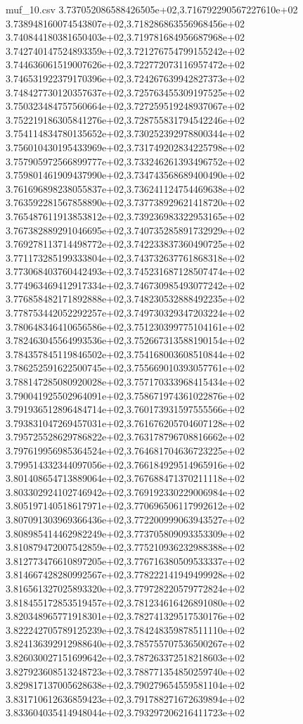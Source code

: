 \begin{filecontents*}{muf_10.csv}
3.737052086588426505e+02,3.716792290567227610e+02
3.738948160074543807e+02,3.718286863556968456e+02
3.740844180381650403e+02,3.719781684956687968e+02
3.742740147524893359e+02,3.721276754799155242e+02
3.744636061519007626e+02,3.722772073116957472e+02
3.746531922379170396e+02,3.724267639942827373e+02
3.748427730120357637e+02,3.725763455309197525e+02
3.750323484757560664e+02,3.727259519248937067e+02
3.752219186305841276e+02,3.728755831794542246e+02
3.754114834780135652e+02,3.730252392978800344e+02
3.756010430195433969e+02,3.731749202834225798e+02
3.757905972566899777e+02,3.733246261393496752e+02
3.759801461909437990e+02,3.734743568689400490e+02
3.761696898238055837e+02,3.736241124754469638e+02
3.763592281567858890e+02,3.737738929621418720e+02
3.765487611913853812e+02,3.739236983322953165e+02
3.767382889291046695e+02,3.740735285891732929e+02
3.769278113714498772e+02,3.742233837360490725e+02
3.771173285199333804e+02,3.743732637761868318e+02
3.773068403760442493e+02,3.745231687128507474e+02
3.774963469412917334e+02,3.746730985493077242e+02
3.776858482171892888e+02,3.748230532888492235e+02
3.778753442052292257e+02,3.749730329347203224e+02
3.780648346410656586e+02,3.751230399775104161e+02
3.782463045564993536e+02,3.752667313588190154e+02
3.784357845119846502e+02,3.754168003608510844e+02
3.786252591622500745e+02,3.755669010393057761e+02
3.788147285080920028e+02,3.757170333968415434e+02
3.790041925502964091e+02,3.758671974361022876e+02
3.791936512896484714e+02,3.760173931597555566e+02
3.793831047269457031e+02,3.761676205704607128e+02
3.795725528629786822e+02,3.763178796708816662e+02
3.797619956985364524e+02,3.764681704636723225e+02
3.799514332344097056e+02,3.766184929514965916e+02
3.801408654713889064e+02,3.767688471370211118e+02
3.803302924102746942e+02,3.769192330229006984e+02
3.805197140518617971e+02,3.770696506117992612e+02
3.807091303969366436e+02,3.772200999063943527e+02
3.808985414462982249e+02,3.773705809093353309e+02
3.810879472007542859e+02,3.775210936232988388e+02
3.812773476610897205e+02,3.776716380509533337e+02
3.814667428280992567e+02,3.778222141949499928e+02
3.816561327025893320e+02,3.779728220579772824e+02
3.818455172853519457e+02,3.781234616426891080e+02
3.820348965771918301e+02,3.782741329517530176e+02
3.822242705789125239e+02,3.784248359878511110e+02
3.824136392912988640e+02,3.785755707536500267e+02
3.826030027151699642e+02,3.787263372518218603e+02
3.827923608513248723e+02,3.788771354850259740e+02
3.829817137005628638e+02,3.790279654559581104e+02
3.831710612636859423e+02,3.791788271672639894e+02
3.833604035414948044e+02,3.793297206216411723e+02

\end{filecontents*}
